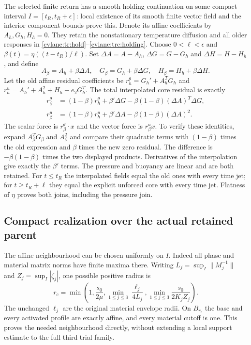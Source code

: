 The selected finite return has a smooth holding continuation on
some compact interval $I=[t_R,t_R+\epsilon]$: local existence of
its smooth finite vector field and the interior component bounds
prove this.  Denote its affine coefficients by $A_h,G_h,H_h=0$.
They retain the nonstationary temperature diffusion and all older
responses in \eqref{cvlane:tr:hold}--\eqref{cvlane:trc:holding}.
Choose $0<\ell<\epsilon$ and $\beta(t)=\eta((t-t_R)/\ell)$.
Set $\Delta A=A-A_h$, $\Delta G=G-G_h$ and $\Delta H=H-H_h$,
and define
\begin{equation}\label{cvlane:irc:flat-interpolation}
 A_\beta=A_h+\beta\Delta A,\quad
 G_\beta=G_h+\beta\Delta G,\quad
 H_\beta=H_h+\beta\Delta H.
\end{equation}
Let the old affine residual coefficients be
$r_h^\theta=G_h'+A_h^TG_h$ and
$r_h^u=A_h'+A_h^2+H_h-e_2G_h^T$.
The total interpolated core residual is exactly
\begin{align}
 r_\beta^\theta&=(1-\beta)r_h^\theta
             +\beta'\Delta G
             -\beta(1-\beta)(\Delta A)^T\Delta G,
 \label{cvlane:irc:transition-scalar}\\
 r_\beta^u&=(1-\beta)r_h^u
             +\beta'\Delta A-\beta(1-\beta)(\Delta A)^2.
 \label{cvlane:irc:transition-vector}
\end{align}
The scalar force is $r_\beta^\theta\cdot x$ and the vector
force is $r_\beta^ux$.  To verify these identities, expand
$A_\beta^TG_\beta$ and $A_\beta^2$ and compare their
quadratic terms with $(1-\beta)$ times the old expression and
$\beta$ times the new zero residual.  The difference is
$-\beta(1-\beta)$ times the two displayed products.  Derivatives
of the interpolation give exactly the $\beta'$ terms.
The pressure and buoyancy are linear and are both retained.
For $t\leq t_R$ the interpolated fields equal the old ones with
every time jet; for $t\geq t_R+\ell$ they equal the explicit
unforced core with every time jet.  Flatness of $\eta$ proves both
joins, including the pressure join.

\subsection{Compact realization over the actual retained parent}

The affine neighbourhood can be chosen uniformly on $I$.
Indeed all phase and material matrix norms have finite maxima there.
Writing $L_j=\sup_I\|M_j^{-1}\|$ and
$Z_j=\sup_I|\zeta_j|$, one possible positive radius is
\[
 r_c=\min\left(1,\frac{s_0}{2\mu},
       \min_{1\leq j\leq3}\frac{\ell_j}{4L_j},
       \min_{1\leq j\leq3}\frac{s_0}{2K_jZ_j}\right).
\]
The unchanged $\ell_j$ are the original material envelope radii.
On $B_{r_c}$ the base and every activated profile are exactly
affine, and every material cutoff is one.  This proves the needed
neighbourhood directly, without extending a local support estimate
to the full third trial family.

